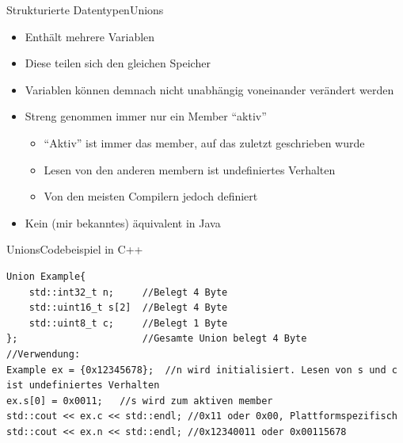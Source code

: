 \begin{frame}{Strukturierte Datentypen}{Unions}
    \begin{itemize}
        \item Enthält mehrere Variablen
        \item Diese teilen sich den gleichen Speicher
        \item Variablen können demnach nicht unabhängig voneinander verändert werden
        \item Streng genommen immer nur ein Member "`aktiv"'
        \begin{itemize}
            \item "`Aktiv"' ist immer das member, auf das zuletzt geschrieben wurde
            \item Lesen von den anderen membern ist undefiniertes Verhalten
            \item Von den meisten Compilern jedoch definiert
        \end{itemize}
        \item Kein (mir bekanntes) äquivalent in Java
    \end{itemize}
\end{frame}

\begin{frame}[fragile]{Unions}{Codebeispiel in C++}
\lstset{style=cpp}
\begin{lstlisting}
Union Example{
    std::int32_t n;     //Belegt 4 Byte
    std::uint16_t s[2]  //Belegt 4 Byte
    std::uint8_t c;     //Belegt 1 Byte
};                      //Gesamte Union belegt 4 Byte
//Verwendung:
Example ex = {0x12345678};  //n wird initialisiert. Lesen von s und c ist undefiniertes Verhalten
ex.s[0] = 0x0011;   //s wird zum aktiven member
std::cout << ex.c << std::endl; //0x11 oder 0x00, Plattformspezifisch
std::cout << ex.n << std::endl; //0x12340011 oder 0x00115678
\end{lstlisting}
\end{frame}